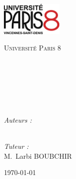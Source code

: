 \begin{titlepage}

\begin{center}

\begin{minipage}[t]{0.48\textwidth}
  \begin{flushleft}
    \includegraphics [width=30mm]{figures/logop8.png} \\[0.5cm]
    \begin{spacing}{1.5}
      \textsc{Université Paris 8}
    \end{spacing}
  \end{flushleft}
\end{minipage}
\begin{minipage}[t]{0.48\textwidth}
  \begin{flushright}
  \end{flushright}
\end{minipage} \\[1.5cm]

\textsc{\Large \reportsubject}\\[0.5cm]
\HRule \\[0.4cm]
{\huge \bfseries \reporttitle}\\[0.4cm]
\HRule \\[1.5cm]

\begin{minipage}[t]{0.3\textwidth}
  \begin{flushleft} \large
    \emph{Auteurs :}\\
    \reportauthora\\
    \reportauthorb
  \end{flushleft}
\end{minipage}
\begin{minipage}[t]{0.6\textwidth}
  \begin{flushright} \large
    \emph{Tuteur :} \\
    M.~Larbi \textsc{BOUBCHIR} \\
  \end{flushright}
\end{minipage}

\vfill

{\large \today}

\end{center}

\end{titlepage}
